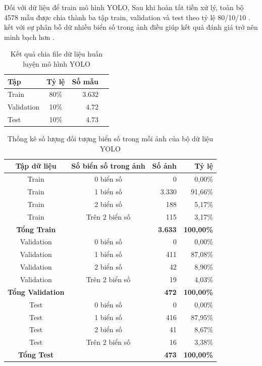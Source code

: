 \documentclass[13pt,a4paper]{report}
\begin{document}
Đối với dữ liệu để train mô hình YOLO, Sau khi hoàn tất tiền xử lý, toàn bộ 4578 mẫu được chia thành ba tập train, validation và test theo tỷ lệ 80/10/10 . kết với sự phân bỗ dữ nhiều biển số trong ảnh điều giúp kết quả đánh giá trở nên minh bạch hơn .

\begin{table}[H]
	\centering
	\caption{Kết quả chia file dữ liệu huấn luyện mô hình YOLO}
	\label{tab:ket_qua_chia_file}
	\begin{tabular}{|l|c|r|l|}
		\hline
		\textbf{Tập} & \textbf{Tỷ lệ} & \textbf{Số mẫu}  \\ 
		\hline
		Train & 80\% & 3.632 \\ 
		\hline
		Validation & 10\% & 4.72\\ 
		\hline
		Test & 10\% & 4.73 \\ 
		\hline
	\end{tabular}
\end{table}

\begin{table}[H]
	\centering
	\caption{Thống kê số lượng đối tượng biển số trong mỗi ảnh của bộ dữ liệu YOLO}
	\label{tab:yolo_object_per_image_split}
	\renewcommand{\arraystretch}{1.4}
	\begin{tabular}{|c|c|r|r|}
		\hline
		\textbf{Tập dữ liệu} & \textbf{Số biển số trong ảnh} & \textbf{Số ảnh} & \textbf{Tỷ lệ} \\
		\hline
		Train & 0 biển số & 0 & 0,00\% \\
		\hline
		Train & 1 biển số & 3.330 & 91,66\% \\
		\hline
		Train & 2 biển số & 188 & 5,17\% \\
		\hline
		Train & Trên 2 biển số & 115 & 3,17\% \\
		\hline
		\textbf{Tổng Train} &  & \textbf{3.633} & \textbf{100,00\%} \\
		\hline
		
		Validation & 0 biển số & 0 & 0,00\% \\
		\hline
		Validation & 1 biển số & 411 & 87,08\% \\
		\hline
		Validation & 2 biển số & 42 & 8,90\% \\
		\hline
		Validation & Trên 2 biển số & 19 & 4,03\% \\
		\hline
		\textbf{Tổng Validation} &  & \textbf{472} & \textbf{100,00\%} \\
		\hline
		
		Test & 0 biển số & 0 & 0,00\% \\
		\hline
		Test & 1 biển số & 416 & 87,95\% \\
		\hline
		Test & 2 biển số & 41 & 8,67\% \\
		\hline
		Test & Trên 2 biển số & 16 & 3,38\% \\
		\hline
		\textbf{Tổng Test} &  & \textbf{473} & \textbf{100,00\%} \\
		\hline
		
	\end{tabular}
\end{table}
\end{document}
